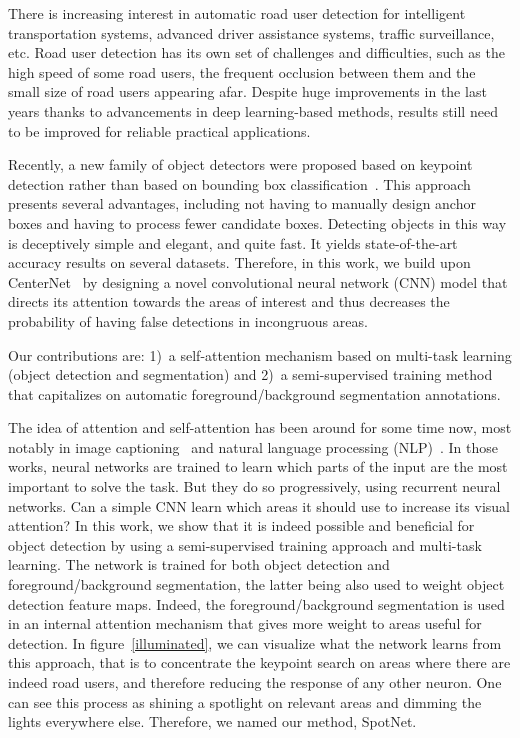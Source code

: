 \documentclass[10pt, conference, compsocconf]{IEEEtran}
\begin{document}
There is increasing interest in automatic road user detection for intelligent transportation systems, advanced driver assistance systems, traffic surveillance, etc. Road user detection has its own set of challenges and difficulties, such as the high speed of some road users, the frequent occlusion between them and the small size of road users appearing afar. Despite huge improvements in the last years thanks to advancements in deep learning-based methods, results still need to be improved for reliable practical applications.

Recently, a new family of object detectors were proposed based on keypoint detection rather than based on bounding box classification~\cite{law2018cornernet,duan2019centernet,zhou2019objectsaspoints}. This approach presents several advantages, including not having to manually design anchor boxes and having to process fewer candidate boxes. Detecting objects in this way is deceptively simple and elegant, and quite fast. It yields state-of-the-art accuracy results on several datasets. Therefore, in this work, we build upon CenterNet~\cite{zhou2019objectsaspoints} by designing a novel convolutional neural network (CNN) model that directs its attention towards the areas of interest and thus decreases the probability of having false detections in incongruous areas. 

Our contributions are: 1)~a self-attention mechanism based on multi-task learning (object detection and segmentation) and 2)~a semi-supervised training method that capitalizes on automatic foreground/background segmentation annotations.  

The idea of attention and self-attention has been around for some time now, most notably in image captioning~\cite{xu2015show} and natural language processing (NLP)~\cite{vaswani2017attention}. In those works, neural networks are trained to learn which parts of the input are the most important to solve the task. But they do so progressively, using recurrent neural networks. Can a simple CNN learn which areas it should use to increase its visual attention? In this work, we show that it is indeed possible and beneficial for object detection by using a semi-supervised training approach and multi-task learning. The network is trained for both object detection and foreground/background segmentation, the latter being also used to weight object detection feature maps. Indeed, the foreground/background segmentation is used in an internal attention mechanism that gives more weight to areas useful for detection. In figure~\ref{illuminated}, we can visualize what the network learns from this approach, that is to concentrate the keypoint search on areas where there are indeed road users, and therefore reducing the response of any other neuron. One can see this process as shining a spotlight on relevant areas and dimming the lights everywhere else. Therefore, we named our method, SpotNet.
\end{document}
